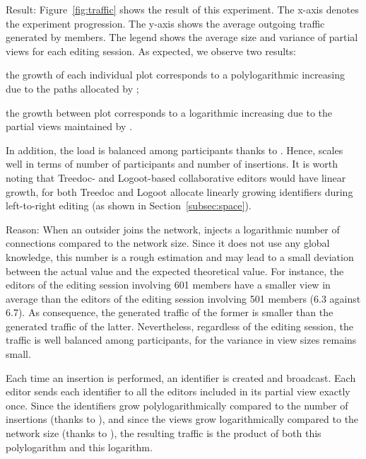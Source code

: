 \begin{asparadesc}
\item [Result:] Figure~\ref{fig:traffic} shows the result of this experiment.
  The x-axis denotes the experiment progression. The y-axis shows the average
  outgoing traffic generated by members. The legend shows the average size and
  variance of partial views for each editing session.  As expected, we observe
  two results:
  \begin{inparaenum}[(i)]
  \item the growth of each individual plot corresponds to a polylogarithmic
    increasing due to the paths allocated by \LSEQ;
  \item the growth between plot corresponds to a logarithmic increasing due to
    the partial views maintained by \SPRAY.
  \end{inparaenum}
  In addition, the load is balanced among participants thanks to \SPRAY.  Hence,
  \CRATE scales well in terms of number of participants and number of
  insertions. It is worth noting that Treedoc- and Logoot-based collaborative
  editors would have linear growth, for both Treedoc and Logoot allocate
  linearly growing identifiers during left-to-right editing (as shown in
  Section~\ref{subsec:space}).
\item [Reason:] When an outsider joins the network, \SPRAY injects a logarithmic
  number of connections compared to the network size. Since it does not use any
  global knowledge, this number is a rough estimation and may lead to a small
  deviation between the actual value and the expected theoretical value. For
  instance, the editors of the editing session involving 601 members have a
  smaller view in average than the editors of the editing session involving 501
  members (6.3 against 6.7). As consequence, the generated traffic of the former
  is smaller than the generated traffic of the latter. Nevertheless, regardless
  of the editing session, the traffic is well balanced among participants, for
  the variance in view sizes remains small.

  Each time an insertion is performed, an identifier is created and broadcast.
  Each editor sends each identifier to all the editors included in its partial
  view exactly once. Since the identifiers grow polylogarithmically compared to
  the number of insertions (thanks to \LSEQ), and since the views grow
  logarithmically compared to the network size (thanks to \SPRAY), the resulting
  traffic is the product of both this polylogarithm and this logarithm.
\end{asparadesc}

